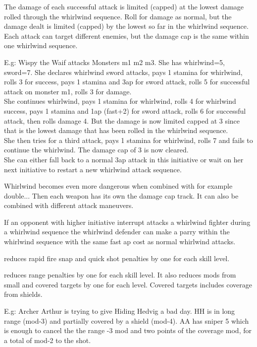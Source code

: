 The damage of each successful attack is limited (capped) at the lowest damage rolled through the whirlwind sequence. Roll for damage as normal, but the damage dealt is limited (capped) by the lowest so far in the whirlwind sequence. Each attack can target different enemies, but the damage cap is the same within one whirlwind sequence.

E.g: Wispy the Waif attacks Monsters m1 m2 m3. She has whirlwind=5, sword=7.
She declares whirlwind sword attacks, 
pays 1 stamina for whirlwind, rolls 3 for success, pays 1 stamina and 3ap for sword attack, rolls 5 for successful attack on monster m1, rolls 3 for damage. \\
She continues whirlwind, pays 1 stamina for whirlwind, rolls 4 for whirlwind success, pays 1 stamina and 1ap (fast+2) for sword attack, rolls 6 for successful attack, then rolls damage 4. But the damage is now limited capped at 3 since that is the lowest damage that has been rolled in the whirlwind sequence. \\
She then tries for a third attack, pays 1 stamina for whirlwind, rolls 7 and fails to continue the whirlwind. The damage cap of 3 is now cleared. \\
She can either fall back to a normal 3ap attack in this initiative or wait on her next initiative to restart a new whirlwind attack sequence.

Whirlwind becomes even more dangerous when combined with for example double... Then each weapon has its own the damage cap track. It can also be combined with different attack maneuvers.

If an opponent with higher initiative interrupt attacks a whirlwind fighter during a whirlwind sequence the whirlwind defender can make a parry within the whirlwind sequence with the same fast ap cost as normal whirlwind attacks.


 reduces rapid fire snap and quick shot penalties by one for each skill level.


 reduces range penalties by one for each skill level. It also reduces mods from small and covered targets by one for each level. Covered targets includes coverage from shields.

E.g: Archer Arthur is trying to give Hiding Hedvig a bad day. HH is in long range (mod-3) and partially covered by a shield (mod-4). AA has sniper 5 which is enough to cancel the the range -3 mod and two points of the coverage mod, for a total of mod-2 to the shot.


